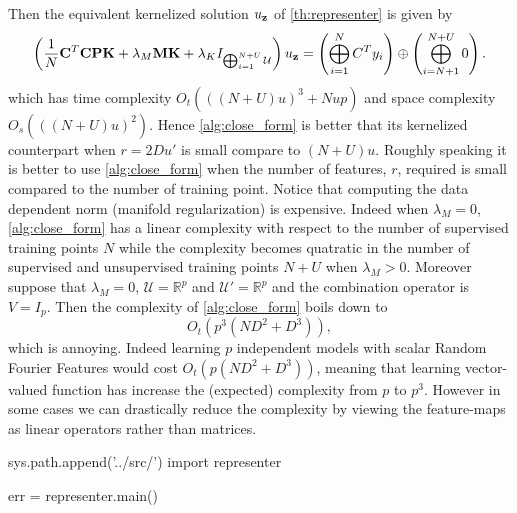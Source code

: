Then the equivalent kernelized solution $u_{\boldsymbol{\mathbf{z}}}$ of \cref{th:representer} is given by~\citet{minh2016unifying}
\begin{dmath*}
\left(\frac{1}{N}\mathbf{C}^T \mathbf{C} \mathbf{P} \mathbf{K} + \lambda_M \mathbf{M} \mathbf{K} + \lambda_K I_{\Vect_{i=1}^{N+U}\mathcal{U}}\right)u_{\seq{z}}=\left(\Vect_{i=1}^N C^T y_i\right) \oplus \left(\Vect_{i=N+1}^{N+U} 0 \right).
\end{dmath*}
which has time complexity $O_t(((N+U)u)^3+ Nup)$ and space complexity $O_s(((N+U)u)^2)$. Hence \cref{alg:close_form} is better that its kernelized counterpart when $r=2Du'$ is small compare to $(N+U)u$. Roughly speaking it is better to use \cref{alg:close_form} when the number of features, $r$, required is small compared to the number of training point. Notice that computing the data dependent norm (manifold regularization) is expensive. Indeed when $\lambda_M=0$, \cref{alg:close_form} has a linear complexity with respect to the number of supervised training points $N$ while the complexity becomes quatratic in the number of supervised and unsupervised training points $N+U$ when $\lambda_M>0$. Moreover suppose that $\lambda_M=0$, $\mathcal{U}=\mathbb{R}^p$ and $\mathcal{U}'=\mathbb{R}^{p}$ and the combination operator is $V=I_{p}$. Then the complexity of \cref{alg:close_form} boils down to
\begin{dmath*}
O_t(p^3(ND^2+D^3)),
\end{dmath*}
which is annoying. Indeed learning $p$ independent models with scalar Random Fourier Features would cost $O_t(p(ND^2+D^3))$, meaning that learning vector-valued function has increase the (expected) complexity from $p$ to $p^3$. However in some cases we can drastically reduce the complexity by viewing the feature-maps as linear operators rather than matrices.

\begin{pycode}[representer]
sys.path.append('../src/')
import representer

err = representer.main()
\end{pycode}


